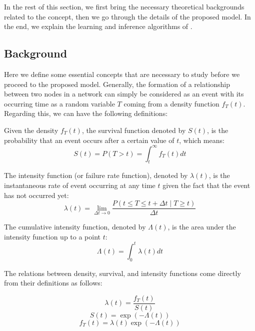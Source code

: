 In the rest of this section, we first bring the necessary theoretical backgrounds related to the concept, then we go through the details of the proposed model. In the end, we explain the learning and inference algorithms of \npglm.

\subsection{Background}
Here we define some essential concepts that are necessary to study before we proceed to the proposed model. Generally, the formation of a relationship between two nodes in a network can simply be considered as an event with its occurring time as a random variable $T$ coming from a density function $f_T(t)$. Regarding this, we can have the following definitions:

\begin{definition}
    Given the density $f_T(t)$, the survival function denoted by $S(t)$, is the probability that an event occurs after a certain value of $t$, which means:
    \begin{equation}
    S(t) = P(T > t) = \int_t^\infty f_T(t)dt
    \end{equation}
\end{definition}

\begin{definition}
    The intensity function (or failure rate function), denoted by $\lambda(t)$, is the instantaneous rate of event occurring at any time $t$ given the fact that the event has not occurred yet:
    \begin{equation}
    \lambda(t)=\lim_{\Delta t\rightarrow 0}\frac{P(t\le T\le t+\Delta t\mid T\ge t)}{\Delta t}
    \end{equation}
\end{definition}

\begin{definition}
    The cumulative intensity function, denoted by $\Lambda(t)$, is the area under the intensity function up to a point $t$:
    \begin{equation}\label{eq:Lambda}
    \Lambda(t)=\int_0^t\lambda(t)dt
    \end{equation}
\end{definition}

The relations between density, survival, and intensity functions come directly from their definitions as follows:

\begin{equation}\label{eq:intensity}
\lambda(t)=\frac{f_T(t)}{S(t)}
\end{equation}
\begin{equation}\label{eq:reliability}
S(t)=\exp(-\Lambda(t))
\end{equation}
\begin{equation}\label{eq:density}
f_T(t)=\lambda(t)\exp(-\Lambda(t))
\end{equation}

